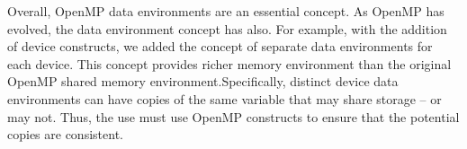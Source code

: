 Overall, OpenMP data environments are an essential concept. As OpenMP
has evolved, the data environment concept has also. For example, with 
the addition of device constructs, we added the concept of separate 
data environments for each device. This concept provides richer memory
environment than the original OpenMP shared memory environment.Specifically,
distinct device data environments can have copies of the same variable
that may share storage -- or may not. Thus, the use must use OpenMP 
constructs to ensure that the potential copies are consistent.
